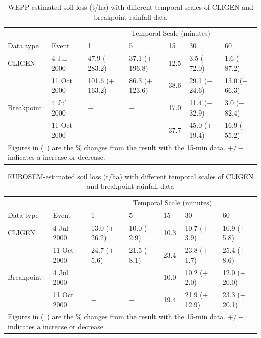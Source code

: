\begin{table}[htbp]
  \centering
  \footnotesize
  \caption[WEPP-estimated soil loss with different temporal scales of CLIGEN and
breakpoint rainfall data]{WEPP-estimated soil loss (t/ha) with different
temporal scales of CLIGEN and breakpoint rainfall data}
  \label{tab:DifferentTemporalScalesOfRainfallDataOnWEPPSoilLossEstimation}
    \begin{tabular}{lllllll}
    \toprule
    & & \multicolumn{5}{c}{Temporal Scale (minutes)}\\
      \cmidrule{3-7}
    Data type & Event & 1 & 5 & 15 & 30 & 60 \\
    \midrule
    CLIGEN & 4 Jul 2000 & 47.9 ($+$283.2) & 37.1 ($+$196.8) & 12.5 & 3.5
($-$72.0) & 1.6 ($-$87.2) \\
     & 11 Oct 2000 & 101.6 ($+$163.2) & 86.3 ($+$123.6) & 38.6 & 29.1 ($-$24.6)
& 13.0 ($-$66.3) \\
     \midrule
    Breakpoint & 4 Jul 2000 & $-$ & $-$ & 17.0 & 11.4 ($-$32.9) & 3.0 ($-$82.4)
\\
     & 11 Oct 2000 & $-$ & $-$ & 37.7 & 45.0 ($+$19.4) & 16.9 ($-$55.2) \\
    \bottomrule
    \multicolumn{7}{p{13cm}}{\footnotesize Figures in (\ ) are the \% changes
from the result with the 15-min data. $+/-$ indicates a increase or decrease.}\\
    \end{tabular}
\end{table}

\begin{table}[htbp]
  \centering
  \footnotesize
  \caption[EUROSEM-estimated soil loss with different temporal scales of CLIGEN
and breakpoint rainfall data]{EUROSEM-estimated soil loss (t/ha) with different
temporal scales of CLIGEN and breakpoint rainfall data}
  \label{tab:DifferentTemporalScalesOfRainfallDataOnEUROSEMSoilLoss}
    \begin{tabular}{lllllll}
    \toprule
    & & \multicolumn{5}{c}{Temporal Scale (minutes)}\\
      \cmidrule{3-7}
    Data type & Event & 1 & 5 & 15 & 30 & 60 \\
    \midrule
    CLIGEN & 4 Jul 2000 & 13.0 ($+$26.2) & 10.0 ($-$2.9) & 10.3 & 10.7 ($+$3.9)
& 10.9 ($+$5.8) \\
     & 11 Oct 2000 & 24.7 ($+$5.6) & 21.5 ($-$8.1) & 23.4 & 23.8 ($+$1.7) & 25.4
($+$8.6) \\
     \midrule
    Breakpoint & 4 Jul 2000 & $-$ & $-$ & 10.0 & 10.2 ($+$2.0) & 12.0 ($+$20.0)
\\
     & 11 Oct 2000 & $-$ & $-$ & 19.4 & 21.9 ($+$12.9) & 23.3 ($+$20.1) \\
    \bottomrule
    \multicolumn{7}{p{12cm}}{\footnotesize Figures in (\ ) are the \% changes
from the result with the 15-min data. $+/-$ indicates a increase or decrease.}\\
    \end{tabular}
\end{table}

